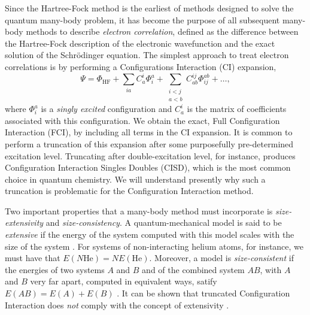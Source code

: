     Since the Hartree-Fock method is the earliest of methods designed to solve the quantum 
    many-body problem, it has become the purpose of all subsequent many-body methods to describe 
    \emph{electron correlation}, defined as the difference between the 
    Hartree-Fock description of the electronic wavefunction and the exact solution of 
    the Schrödinger equation. The simplest approach to treat electron correlations
    is by performing a Configurations Interaction (CI) expansion,
    \begin{equation}
        \Psi = \Phi_\text{HF} 
            + \sum_{ia} C^i_a\Phi^a_i 
            + \sum_{\substack{i < j \\ a < b}} C^{ij}_{ab} \Phi^{ab}_{ij} + \dots,
    \end{equation}
    where $\Phi^a_i$ is a \emph{singly excited} configuration and $C^i_a$ is the matrix of 
    coefficients associated with this configuration. We obtain the exact,
    Full Configuration Interaction (FCI), by including all terms in the CI expansion.
    It is common to perform a truncation of this expansion after some purposefully 
    pre-determined excitation level. Truncating after 
    double-excitation level, for instance, produces Configuration Interaction Singles Doubles (CISD), 
    which is the most common choice in quantum chemistry.
    We will understand presently why such a truncation is problematic for the Configuration
    Interaction method.

    Two important properties that a many-body method must incorporate is \emph{size-extensivity}
    and \emph{size-consistency}. A quantum-mechanical model is said to be \emph{extensive}
    if the energy of the system computed with this model scales with the size of the 
    system \cite{bartlett1978many}. For systems of non-interacting helium atoms, for instance,
    we must have that $E(N\text{He}) = NE(\text{He})$. Moreover, a model is \emph{size-consistent}
    if the energies of two systems $A$ and $B$ and of the combined system $AB$, with 
    $A$ and $B$ very far apart, computed in equivalent ways, satify
    $E(AB) = E(A) + E(B)$ \cite{pople1976theoretical}. It can be shown that 
    truncated Configuration Interaction does \emph{not} comply with the concept of
    extensivity \cite{shavitt2009many}.

